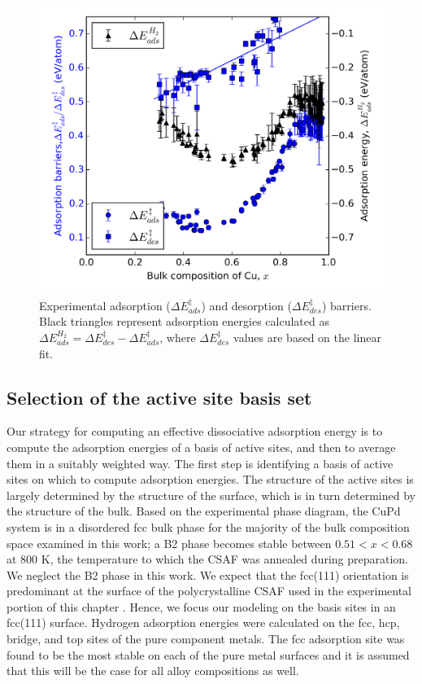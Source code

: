 \documentclass[12pt]{cmuthesis}
\begin{document}
\begin{figure}[h]
\centering
\includegraphics[width=5in]{./images/exp.png}
\caption{Experimental adsorption (\(\Delta E^{\ddagger}_{ads}\)) and desorption (\(\Delta E^{\ddagger}_{des}\)) barriers. Black triangles represent adsorption energies calculated as \(\Delta E^{H_{2}}_{ads} = \Delta E^{\ddagger}_{des} - \Delta E^{\ddagger}_{ads}\), where \(\Delta E^{\ddagger}_{des}\) values are based on the linear fit. \label{fig:exp-ads}}
\end{figure}

\subsection{Selection of the active site basis set}
\label{sec:org1f0a627}
Our strategy for computing an effective dissociative adsorption energy is to compute the adsorption energies of a basis of active sites, and then to average them in a suitably weighted way. The first step is identifying a basis of active sites on which to compute adsorption energies. The structure of the active sites is largely determined by the structure of the surface, which is in turn determined by the structure of the bulk. Based on the experimental phase diagram, \cite{dowben-1990-surfac-segreg-phenom,subramanian-1991-cu-pd-pallad} the CuPd system is in a disordered fcc bulk phase for the majority of the bulk composition space examined in this work; a B2 phase becomes stable between \(0.51 < x < 0.68\) at 800 K, the temperature to which the CSAF was annealed during preparation. We neglect the B2 phase in this work. We expect that the  fcc(111) orientation is predominant at the surface of the polycrystalline CSAF used in the experimental portion of this chapter \cite{obrien-2012-h-d}. Hence, we focus our modeling on the basis sites in an fcc(111) surface. Hydrogen adsorption energies were calculated on the fcc, hcp, bridge, and top sites of the pure component metals. The fcc adsorption site was found to be the most stable on each of the pure metal surfaces and it is assumed that this will be the case for all alloy compositions as well.
\end{document}
